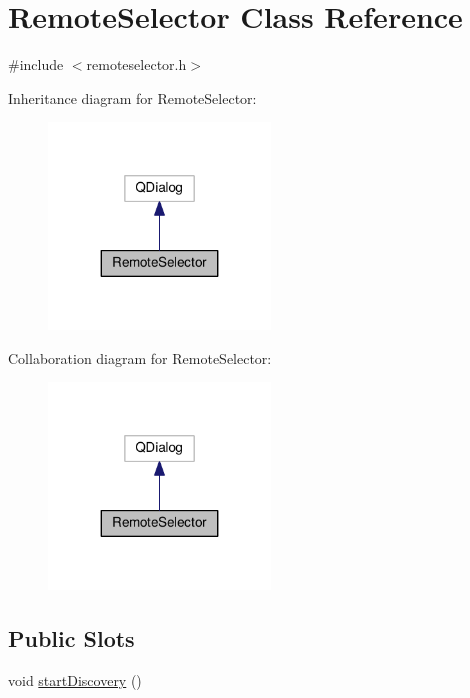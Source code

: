 \hypertarget{classRemoteSelector}{}\section{Remote\+Selector Class Reference}
\label{classRemoteSelector}


{\ttfamily \#include $<$remoteselector.\+h$>$}



Inheritance diagram for Remote\+Selector\+:
\nopagebreak
\begin{figure}[H]
\begin{center}
\leavevmode
\includegraphics[width=167pt]{classRemoteSelector__inherit__graph}
\end{center}
\end{figure}


Collaboration diagram for Remote\+Selector\+:
\nopagebreak
\begin{figure}[H]
\begin{center}
\leavevmode
\includegraphics[width=167pt]{classRemoteSelector__coll__graph}
\end{center}
\end{figure}
\subsection*{Public Slots}
\begin{DoxyCompactItemize}
\item 
void \hyperlink{classRemoteSelector_a63cf76514fa5b2bf1b85b87db1a49e99}{start\+Discovery} ()
\end{DoxyCompactItemize}
